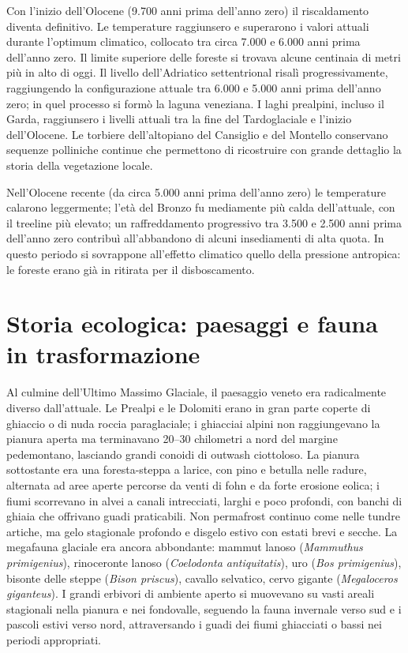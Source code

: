 Con l'inizio dell'Olocene (9.700 anni prima dell'anno zero) il riscaldamento diventa definitivo. Le temperature raggiunsero e superarono i valori attuali durante l'optimum climatico, collocato tra circa 7.000 e 6.000 anni prima dell'anno zero. Il limite superiore delle foreste si trovava alcune centinaia di metri più in alto di oggi. Il livello dell'Adriatico settentrional risalì progressivamente, raggiungendo la configurazione attuale tra 6.000 e 5.000 anni prima dell'anno zero; in quel processo si formò la laguna veneziana. I laghi prealpini, incluso il Garda, raggiunsero i livelli attuali tra la fine del Tardoglaciale e l'inizio dell'Olocene. Le torbiere dell'altopiano del Cansiglio e del Montello conservano sequenze polliniche continue che permettono di ricostruire con grande dettaglio la storia della vegetazione locale.

Nell'Olocene recente (da circa 5.000 anni prima dell'anno zero) le temperature calarono leggermente; l'età del Bronzo fu mediamente più calda dell'attuale, con il treeline più elevato; un raffreddamento progressivo tra 3.500 e 2.500 anni prima dell'anno zero contribuì all'abbandono di alcuni insediamenti di alta quota. In questo periodo si sovrappone all'effetto climatico quello della pressione antropica: le foreste erano già in ritirata per il disboscamento.

\section{Storia ecologica: paesaggi e fauna in trasformazione}

Al culmine dell'Ultimo Massimo Glaciale, il paesaggio veneto era radicalmente diverso dall'attuale. Le Prealpi e le Dolomiti erano in gran parte coperte di ghiaccio o di nuda roccia paraglaciale; i ghiacciai alpini non raggiungevano la pianura aperta ma terminavano 20--30 chilometri a nord del margine pedemontano, lasciando grandi conoidi di outwash ciottoloso. La pianura sottostante era una foresta-steppa a larice, con pino e betulla nelle radure, alternata ad aree aperte percorse da venti di fohn e da forte erosione eolica; i fiumi scorrevano in alvei a canali intrecciati, larghi e poco profondi, con banchi di ghiaia che offrivano guadi praticabili. Non permafrost continuo come nelle tundre artiche, ma gelo stagionale profondo e disgelo estivo con estati brevi e secche. La megafauna glaciale era ancora abbondante: mammut lanoso (\textit{Mammuthus primigenius}), rinoceronte lanoso (\textit{Coelodonta antiquitatis}), uro (\textit{Bos primigenius}), bisonte delle steppe (\textit{Bison priscus}), cavallo selvatico, cervo gigante (\textit{Megaloceros giganteus}). I grandi erbivori di ambiente aperto si muovevano su vasti areali stagionali nella pianura e nei fondovalle, seguendo la fauna invernale verso sud e i pascoli estivi verso nord, attraversando i guadi dei fiumi ghiacciati o bassi nei periodi appropriati.

